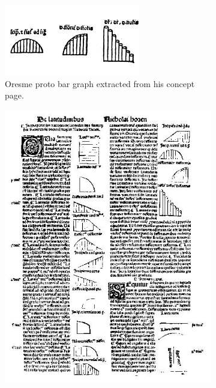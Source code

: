 \cbstart
\begin{figure}[!htb]
  \captionsetup[subfigure]{justification=centering}
  \centering
  \begin{subfigure}[b]{0.4\textwidth}
    \includegraphics[width=\textwidth,keepaspectratio]{images/history/oresme-proto.jpg}
    \caption{Oresme proto bar graph extracted from his concept page.}
    \label{fig:oresme-proto}
  \end{subfigure}
  \hfill
  \begin{subfigure}[b]{0.4\textwidth}
    \includegraphics[width=\textwidth,keepaspectratio]{images/history/oresme-page.jpg}

\end{subfigure}
\end{figure}
